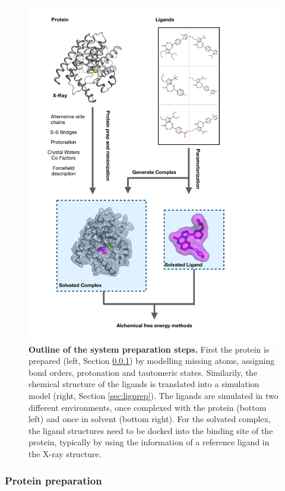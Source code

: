 \documentclass[9pt,bestpractices]{livecoms}
\begin{document}
\begin{figure}[!ht]
    \centering
    \includegraphics[width=0.95\linewidth]{figures/system_prep.pdf}
    \caption{\textbf{Outline of the system preparation steps.} 
    First the protein is prepared (left, Section \ref{sec:protprep}) by modelling missing atoms, assigning bond orders, protonation and tautomeric states. 
    Similarily, the chemical structure of the ligands is translated into a simulation model (right, Section \ref{sec:ligprep}). 
    The ligands are simulated in two different environments, once complexed with the protein (bottom left) and once in solvent (bottom right). 
    For the solvated complex, the ligand structures need to be docked into the binding site of the protein, typically by using the information of a reference ligand in the X-ray structure.
    }
    \label{fig:system_preparation}
\end{figure}

\subsubsection{Protein preparation}
\label{sec:protprep}
\end{document}
